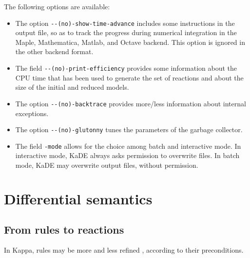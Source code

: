 \documentclass[11pt]{book}
\def\KaDE{\textsf{KaDE}}
\begin{document}
The following options are available:
\begin{itemize}
\item The option \texttt{-{}-(no)-show-time-advance} includes some
instructions in the output file, so as to track the progress during numerical integration in the Maple, Mathematica, Matlab, and Octave backend.
This option is ignored in the other backend format.

\item The field \texttt{-{}-(no)-print-efficiency} provides some information about the CPU time that has been used to generate the set of reactions and about the size of the initial and reduced models.

\item The option \texttt{-{}-(no)-backtrace} provides more/less information about internal exceptions.
\item The option \texttt{-{}-(no)-glutonny} tunes the parameters of the garbage collector.
\item The field \texttt{-mode} allows for the choice among batch and interactive mode. In interactive mode, {\KaDE} always asks  permission to  overwrite files. In batch mode, {\KaDE} may overwrite output files, without permission.
\end{itemize}



\section{Differential semantics}
\label{sec:differential semantics}

\subsection{From rules to reactions}

In Kappa, rules may be more and less refined \cite{DanosFFHK08,DBLP:journals/tcsb/DanosFFHK09}, according to their preconditions.
\end{document}

